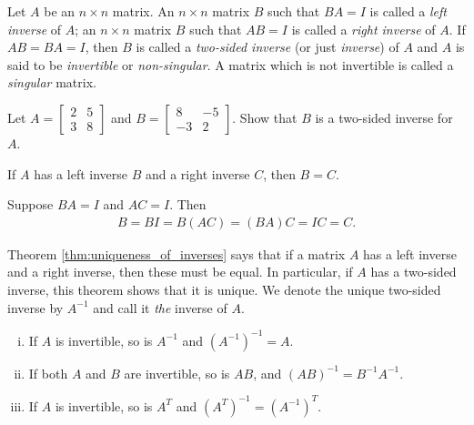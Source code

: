 \documentclass[12pt,letterpaper,reqno]{article}
\numberwithin{equation}{section}
\begin{document}
\begin{defn}
	Let $A$ be an $n \times n$ matrix. An $n \times n$ matrix $B$ such that $BA=I$ is called a \emph{left inverse} of $A$; an $n \times n$ matrix $B$ such that $AB=I$ is called a \emph{right inverse} of $A$. If $AB=BA=I$, then $B$ is called a \emph{two-sided inverse} (or just \emph{inverse}) of $A$ and $A$ is said to be \emph{invertible} or \emph{non-singular}. A matrix which is not invertible is called a \emph{singular} matrix.
\end{defn}

\begin{exercise}
Let $A=\begin{bmatrix}
	2&5 \\ 3&8
\end{bmatrix}$ and $B=\begin{bmatrix}
	8&-5 \\ -3&2
\end{bmatrix}$. Show that $B$ is a two-sided inverse for $A$.	
\end{exercise}

\begin{thm}\label{thm:uniqueness_of_inverses}
	If $A$ has a left inverse $B$ and a right inverse $C$, then $B=C$. 
\end{thm}

\begin{pf}
Suppose $BA=I$ and $AC=I$. Then
\begin{align*}
	B=BI=B(AC)=(BA)C=IC=C. 
\end{align*}	
\end{pf}

Theorem \ref{thm:uniqueness_of_inverses} says that if a matrix $A$ has a left inverse and a right inverse, then these must be equal. In particular, if $A$ has a two-sided inverse, this theorem shows that it is unique. We denote the unique two-sided inverse by $A^{-1}$ and call it \emph{the} inverse of $A$.

\begin{thm}[Properties of $A^{-1}$]\label{thm:properties_of_A_inverse} \hspace{10cm}
		\begin{enumerate}[(i)]
		\item If $A$ is invertible, so is $A^{-1}$ and $(A^{-1})^{-1}=A$.
		\item If both $A$ and $B$ are invertible, so is $AB$, and $(AB)^{-1}=B^{-1}A^{-1}$.
		\item If $A$ is invertible, so is $A^T$ and $(A^T)^{-1}=(A^{-1})^T$.
	\end{enumerate}
\end{thm}
\end{document}

